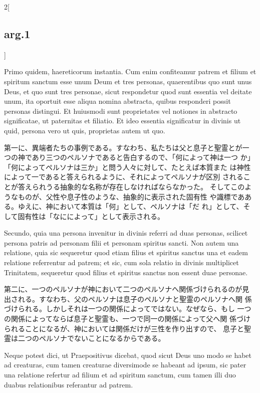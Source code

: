 \documentclass[paper=a4paper,fontsize=10pt,jafontsize=9pt,titlepage]{jlreq}
\begin{document}
\begin{paracol}{2}[\subsection{arg.1}]
\switchcolumn*

Primo quidem, haereticorum instantia. Cum enim confiteamur
patrem et filium et spiritum sanctum esse unum Deum et tres personas,
quaerentibus quo sunt unus Deus, et quo sunt tres personae, sicut
respondetur quod sunt essentia vel deitate unum, ita oportuit esse
aliqua nomina abstracta, quibus responderi possit personas
distingui. Et huiusmodi sunt proprietates vel notiones in abstracto
significatae, ut paternitas et filiatio. Et ideo essentia significatur
in divinis ut quid, persona vero ut quis, proprietas autem ut
quo.

\switchcolumn

第一に、異端者たちの事例である。すなわち、私たちは父と息子と聖霊とが一
 つの神であり三つのペルソナであると告白するので、「何によって神は一つ
 か」「何によってペルソナは三か」と問う人々に対して、たとえば本質また
 は神性によって一であると答えられるように、それによってペルソナが区別
 されることが答えられうる抽象的な名称が存在しなければならなかった。
そしてこのようなものが、父性や息子性のような、抽象的に表示された固有性
 や識標であある。ゆえに、神において本質は「何」として、ペルソナは「だ
 れ」として、そして固有性は「なにによって」として表示される。

\switchcolumn*

Secundo, quia una persona invenitur in divinis referri ad duas
personas, scilicet persona patris ad personam filii et personam
spiritus sancti. Non autem una relatione, quia sic sequeretur quod
etiam filius et spiritus sanctus una et eadem relatione referrentur ad
patrem; et sic, cum sola relatio in divinis multiplicet Trinitatem,
sequeretur quod filius et spiritus sanctus non essent duae
personae.

\switchcolumn

第二に、一つのペルソナが神において二つのペルソナへ関係づけられるのが見
 出される。すなわち、父のペルソナは息子のペルソナと聖霊のペルソナへ関
 係づけられる。しかしそれは一つの関係によってではない。なぜなら、もし
 一つの関係によってならば息子と聖霊も、一つで同一の関係によって父へ関
 係づけられることになるが、神においては関係だけが三性を作り出すので、
 息子と聖霊は二つのペルソナでないことになるからである。

\switchcolumn*

Neque potest dici, ut Praepositivus dicebat, quod sicut Deus
uno modo se habet ad creaturas, cum tamen creaturae diversimode se
habeant ad ipsum, sic pater una relatione refertur ad filium et ad
spiritum sanctum, cum tamen illi duo duabus relationibus referantur ad
patrem.


\end{paracol}
\end{document}
